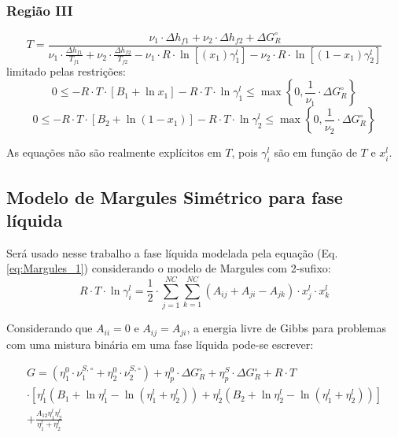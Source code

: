 \subsubsection{Região III}
\begin{equation}\label{eq:Regiao_III_1}
T=\frac{\nu_{1}\cdot\Delta h_{f1} + \nu_{2}\cdot\Delta h_{f2} + \Delta G_{R}^{\circ}}{\nu_{1}\cdot\frac{\Delta h_{f1}}{T_{f1}}+\nu_{2}\cdot\frac{\Delta h_{f2}}{T_{f2}}-\nu_{1}\cdot R\cdot\ln[(x_{1})\gamma_{1}^{l}]-\nu_{2}\cdot R\cdot\ln[(1-x_{1})\gamma_{2}^{l}]}
\end{equation}
limitado pelas restrições:
\begin{equation}\label{eq:Regiao_III_2}
0\leq-R\cdot T\cdot[B_{1}+\ln x_{1}]-R\cdot T\cdot \ln\gamma_{1}^{l}\leq\max\left\{0,\frac{1}{\nu_1}\cdot
\Delta G_{R}^{\circ} \right\}
\end{equation}
\begin{equation}\label{eq:Regiao_III_3}
0\leq-R\cdot T\cdot[B_{2}+\ln(1- x_{1})]-R\cdot T\cdot\ln\gamma_{2}^{l}\leq\max\left\{0,\frac{1}{\nu_2}\cdot
\Delta G_{R}^{\circ} \right\}
\end{equation}

As equações  não são realmente explícitos em $T$, pois $\gamma_{i}^{l}$ são em função de $T$ e $x_{i}^{l}$.

\subsection{Modelo de Margules Simétrico para fase líquida}

Será usado nesse trabalho a fase líquida modelada pela equação (Eq. \ref{eq:Margules_1}) considerando o modelo de Margules com 2-sufixo:
\begin{equation}\label{eq:Margules_1}
R\cdot T\cdot\ln\gamma_{i}^{l}=\frac{1}{2} \cdot\sum_{j=1}^{NC}\sum_{k=1}^{NC}\left( A_{ij}+A_{ji}-A_{jk}\right) \cdot x_{j}^{l}\cdot x_{k}^{l}
\end{equation}

Considerando que $A_{ii}=0$ e $A_{ij}=A_{ji}$, a energia livre de Gibbs para problemas com uma mistura binária em uma fase líquida pode-se escrever:

\begin{equation}
\begin{split}
G=(\eta_{1}^{0}\cdot\nu_{1}^{S,\circ}+\eta_{2}^{0}\cdot\nu_{2}^{S,\circ})+ \eta_{p}^{0}\cdot\Delta G_{R}^{\circ}+ \eta_{p}^{S}\cdot\Delta G_{R}^{\circ} +R\cdot T\\\cdot \left[\eta_{1}^{l} \left( B_{1}+\ln\eta_{1}^{l}-\ln(\eta_{1}^{l} +\eta_{2}^{l} )\right)+\eta_{2}^{l}\left( B_{2}+\ln\eta_{2}^{l}-\ln(\eta_{1}^{l} +\eta_{2}^{l} )\right) \right]
\\+\frac{A_{12}\eta_{1}^{l}\eta_{2}^{l}}{\eta_{1}^{l}+\eta_{2}^{l}}
\end{split}
\end{equation}

